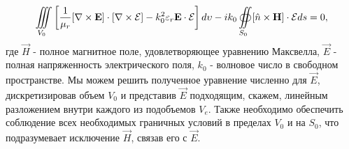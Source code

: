 \begin{equation}
\iiint\limits_{V_{0}}^{} \left[ \dfrac{1}{\mu_{r}}[\nabla \times \vec{E}] \cdot [\nabla \times \vec{\cal{E}}] - k_{0}^{2} \varepsilon_{r}\vec{E} \cdot \vec{\cal{E}} \right]d\upsilon - i k_{0} \oiint\limits_{S_0} [\hat{n} \times \vec{H}] \cdot \vec{\cal{E}}ds = 0,
\end{equation}
где $ \vec{H} $ - полное магнитное поле, удовлетворяющее уравнению Максвелла, $ \vec{E} $ - полная напряженность электрического поля, $ k_{0} $ - волновое число в свободном пространстве. Мы можем решить полученное уравнение численно для $ \vec{E} $, дискретизировав объем $ V_{0} $ и представив $ \vec{E} $ подходящим, скажем, линейным разложением внутри каждого из подобъемов $V_{e}$. Также необходимо обеспечить соблюдение всех необходимых граничных условий в пределах $V_{0}$ и на $S_{0}$, что подразумевает исключение $\vec{H}$, связав его с $\vec{E}$.

